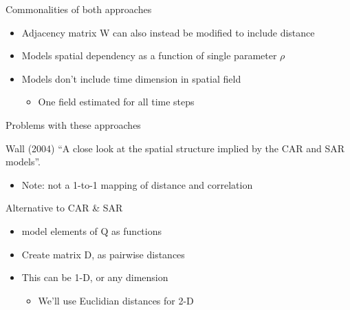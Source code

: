 \documentclass[ignorenonframetext,]{beamer}
\providecommand{\tightlist}{%
  \setlength{\itemsep}{0pt}\setlength{\parskip}{0pt}}
\begin{document}
\begin{frame}{Commonalities of both approaches}
\protect\hypertarget{commonalities-of-both-approaches}{}

\begin{itemize}
\item
  Adjacency matrix W can also instead be modified to include distance
\item
  Models spatial dependency as a function of single parameter \(\rho\)
\item
  Models don't include time dimension in spatial field

  \begin{itemize}
  \tightlist
  \item
    One field estimated for all time steps
  \end{itemize}
\end{itemize}

\end{frame}

\begin{frame}{Problems with these approaches}
\protect\hypertarget{problems-with-these-approaches}{}

Wall (2004) ``A close look at the spatial structure implied by the CAR
and SAR models''.

\begin{itemize}
\tightlist
\item
  Note: not a 1-to-1 mapping of distance and correlation
\end{itemize}

\end{frame}

\begin{frame}{Alternative to CAR \& SAR}
\protect\hypertarget{alternative-to-car-sar}{}

\begin{itemize}
\tightlist
\item
  model elements of Q as functions
\item
  Create matrix D, as pairwise distances
\item
  This can be 1-D, or any dimension

  \begin{itemize}
  \tightlist
  \item
    We'll use Euclidian distances for 2-D
  \end{itemize}
\end{itemize}

\end{frame}
\end{document}
